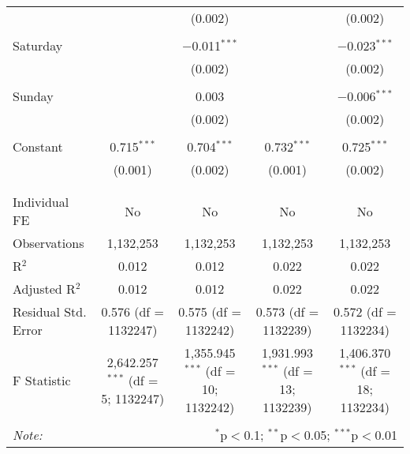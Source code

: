 \documentclass[
]{article}
\begin{document}
\begin{table}[!htbp]
{\begin{tabular}{@{\extracolsep{5pt}}lcccc}
  &  & (0.002) &  & (0.002) \\ 
  & & & & \\ 
 Saturday &  & $-$0.011$^{***}$ &  & $-$0.023$^{***}$ \\ 
  &  & (0.002) &  & (0.002) \\ 
  & & & & \\ 
 Sunday &  & 0.003 &  & $-$0.006$^{***}$ \\ 
  &  & (0.002) &  & (0.002) \\ 
  & & & & \\ 
 Constant & 0.715$^{***}$ & 0.704$^{***}$ & 0.732$^{***}$ & 0.725$^{***}$ \\ 
  & (0.001) & (0.002) & (0.001) & (0.002) \\ 
  & & & & \\ 
\hline \\[-1.8ex] 
Individual FE & No & No & No & No \\ 
Observations & 1,132,253 & 1,132,253 & 1,132,253 & 1,132,253 \\ 
R$^{2}$ & 0.012 & 0.012 & 0.022 & 0.022 \\ 
Adjusted R$^{2}$ & 0.012 & 0.012 & 0.022 & 0.022 \\ 
Residual Std. Error & 0.576 (df = 1132247) & 0.575 (df = 1132242) & 0.573 (df = 1132239) & 0.572 (df = 1132234) \\ 
F Statistic & 2,642.257$^{***}$ (df = 5; 1132247) & 1,355.945$^{***}$ (df = 10; 1132242) & 1,931.993$^{***}$ (df = 13; 1132239) & 1,406.370$^{***}$ (df = 18; 1132234) \\ 
\hline 
\hline \\[-1.8ex] 
\textit{Note:}  & \multicolumn{4}{r}{$^{*}$p$<$0.1; $^{**}$p$<$0.05; $^{***}$p$<$0.01} \\ 
\end{tabular}
} 
\end{table} 
\newpage
\end{document}
